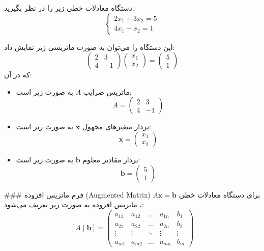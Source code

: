 \begin{example}
دستگاه معادلات خطی زیر را در نظر بگیرید:
\[
\begin{cases}
	2x_1 + 3x_2 = 5 \\
	4x_1 - x_2 = 1
\end{cases}
\]

این دستگاه را می‌توان به صورت ماتریسی زیر نمایش داد:
\[
\begin{pmatrix}
	2 & 3 \\
	4 & -1
\end{pmatrix}
\begin{pmatrix}
	x_1 \\
	x_2
\end{pmatrix}
=
\begin{pmatrix}
	5 \\
	1
\end{pmatrix}
\]
که در آن:

\begin{itemize}
	\item 
	ماتریس ضرایب \( A \) به صورت زیر است:
	\[
	A = \begin{pmatrix}
		2 & 3 \\
		4 & -1
	\end{pmatrix}
	\]
	
	\item 
	بردار متغیرهای مجهول \( \mathbf{x} \) به صورت زیر است:
	\[
	\mathbf{x} = \begin{pmatrix}
		x_1 \\
		x_2
	\end{pmatrix}
	\]
	
	\item 
	بردار مقادیر معلوم \( \mathbf{b} \) به صورت زیر است:
	\[
	\mathbf{b} = \begin{pmatrix}
		5 \\
		1
	\end{pmatrix}
	\]	
\end{itemize}
\end{example}


### فرم ماتریس افزوده (Augmented Matrix)
برای دستگاه معادلات خطی \( A\mathbf{x} = \mathbf{b} \)، ماتریس افزوده به صورت زیر تعریف می‌شود:
\[
[A \mid \mathbf{b}] = 
\left(
\begin{array}{cccc|c}
	a_{11} & a_{12} & \dots & a_{1n} & b_1 \\
	a_{21} & a_{22} & \dots & a_{2n} & b_2 \\
	\vdots & \vdots & \ddots & \vdots & \vdots \\
	a_{m1} & a_{m2} & \dots & a_{mn} & b_m
\end{array}
\right)
\]

